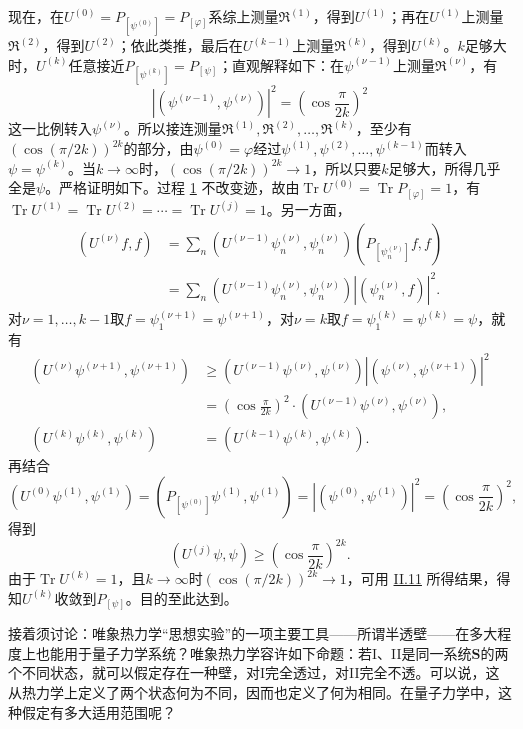 \documentclass[fontsize=13pt,twoside,openany,headings=normal,parskip=false,bookmarkpackage=false,DIV=calc]{scrbook}
\begin{document}
现在，在$U^{(0)}=P_{[\psi^{(0)}]}=P_{[\varphi]}$系综上测量$\mathfrak R^{(1)}$，得到$U^{(1)}$；再在$U^{(1)}$上测量$\mathfrak R^{(2)}$，得到$U^{(2)}$；依此类推，最后在$U^{(k-1)}$上测量$\mathfrak R^{(k)}$，得到$U^{(k)}$。$k$足够大时，$U^{(k)}$任意接近$P_{[\psi^{(k)}]}=P_{[\psi]}$；直观解释如下：在$\psi^{(\nu-1)}$上测量$\mathfrak R^{(\nu)}$，有
\[
|(\psi^{(\nu-1)},\psi^{(\nu)})|^2=\left(\cos\frac\pi{2k}\right)^2
\]
这一比例转入$\psi^{(\nu)}$。所以接连测量$\mathfrak R^{(1)},\allowbreak \mathfrak R^{(2)},\allowbreak \ldots,\allowbreak \mathfrak R^{(k)}$，至少有$(\cos(\pi/2k))^{2k}$的部分，由$\psi^{(0)}=\varphi$经过$\psi^{(1)},\allowbreak \psi^{(2)},\allowbreak \ldots,\allowbreak \psi^{(k-1)}$而转入$\psi=\psi^{(k)}$。当$k\to\infty$时，$(\cos(\pi/2k))^{2k}\to1$，所以只要$k$足够大，所得几乎全是$\psi$。严格证明如下。过程 \hyperref[eq:V.1.1]{1} 不改变迹，故由$\operatorname{Tr}U^{(0)}=\operatorname{Tr}P_{[\varphi]}=1$，有$\operatorname{Tr}U^{(1)}=\operatorname{Tr}U^{(2)}=\cdots=\operatorname{Tr}U^{(j)}=1$。另一方面，
\begin{align*}
(U^{(\nu)}f,f)
&=\sum_n(U^{(\nu-1)}\psi_n^{(\nu)},\psi_n^{(\nu)})(P_{[\psi_n^{(\nu)}]}f,f)\\
&=\sum_n(U^{(\nu-1)}\psi_n^{(\nu)},\psi_n^{(\nu)})|(\psi_n^{(\nu)},f)|^2.
\end{align*}
对$\nu=1,\allowbreak \ldots,\allowbreak k-1$取$f=\psi_1^{(\nu+1)}=\psi^{(\nu+1)}$，对$\nu=k$取$f=\psi_1^{(k)}=\psi^{(k)}=\psi$，就有
\begin{align*}
(U^{(\nu)}\psi^{(\nu+1)},\psi^{(\nu+1)})
&\geq(U^{(\nu-1)}\psi^{(\nu)},\psi^{(\nu)})|(\psi^{(\nu)},\psi^{(\nu+1)})|^2\\
&=\left(\cos\frac\pi{2k}\right)^2\cdot(U^{(\nu-1)}\psi^{(\nu)},\psi^{(\nu)}),\\
(U^{(k)}\psi^{(k)},\psi^{(k)})&=(U^{(k-1)}\psi^{(k)},\psi^{(k)}).
\end{align*}\hypertarget{origpage-196}{}\label{origpage-196}再结合
\[
(U^{(0)}\psi^{(1)},\psi^{(1)})=(P_{[\psi^{(0)}]}\psi^{(1)},\psi^{(1)})
=|(\psi^{(0)},\psi^{(1)})|^2=\left(\cos\frac\pi{2k}\right)^2,
\]
得到
\[
(U^{(j)}\psi,\psi)\geq\left(\cos\frac\pi{2k}\right)^{2k}.
\]
由于$\operatorname{Tr}U^{(k)}=1$，且$k\to\infty$时$(\cos(\pi/2k))^{2k}\to1$，可用 \hyperref[sec:II.11]{II.11} 所得结果，得知$U^{(k)}$收敛到$P_{[\psi]}$。目的至此达到。

接着须讨论：唯象热力学“思想实验”的一项主要工具——所谓半透壁——在多大程度上也能用于量子力学系统？唯象热力学容许如下命题：若I、II是同一系统$\boldsymbol{S}$的两个不同状态，就可以假定存在一种壁，对I完全透过，对II完全不透。可以说，这从热力学上定义了两个状态何为不同，因而也定义了何为相同。在量子力学中，这种假定有多大适用范围呢？
\end{document}
